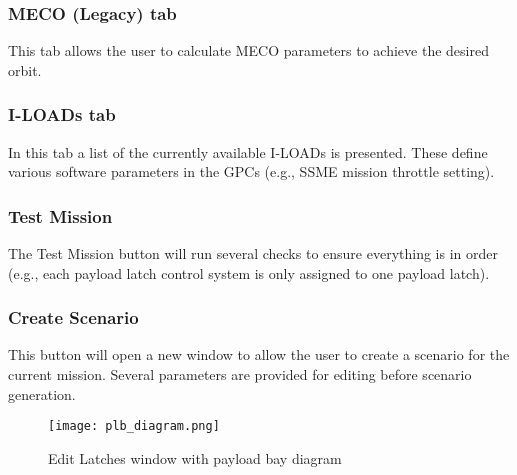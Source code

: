 \documentclass[Space_Shuttle_Vessel_Manual.tex]{subfiles}
\begin{document}
\begin{multicols*}{2}
\subsubsection{MECO (Legacy) tab}
\label{sec:meco-legacy}
This tab allows the user to calculate MECO parameters to achieve the desired orbit.\\


\subsubsection{I-LOADs tab}
In this tab a list of the currently available I-LOADs is presented. These define various software parameters in the GPCs (e.g., SSME mission throttle setting).


\subsubsection{Test Mission}
The Test Mission button will run several checks to ensure everything is in order (e.g., each payload latch control system is only assigned to one payload latch).


\subsubsection{Create Scenario}
This button will open a new window to allow the user to create a scenario for the current mission. Several parameters are provided for editing before scenario generation.


\end{multicols*}

\begin{figure}[H]
	\centering
	\captionsetup{justification=centering}
  \texttt{[image: plb\_diagram.png]}
  \caption{Edit Latches window with payload bay diagram}
  \label{fig:plb_diagram}
\end{figure}
\end{document}
